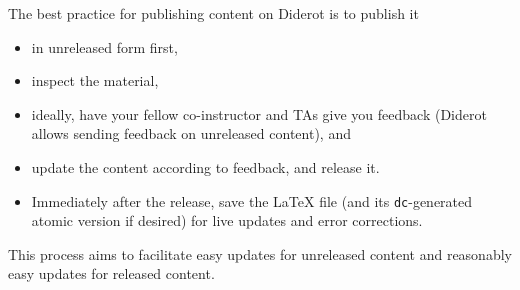 \begin{gram}
The best practice for publishing content on Diderot is to publish it 
\begin{itemize}
\item in unreleased form first, 
\item inspect the material,
\item ideally, have your fellow co-instructor and TAs give you feedback (Diderot allows sending feedback on unreleased content), and 
\item update the content according to feedback, and release it.
\item Immediately after the release, save the LaTeX file (and its \lstinline`dc`-generated atomic version if desired) for live updates and error corrections.
\end{itemize}

This process aims to facilitate easy updates for unreleased content and reasonably easy updates for released content. 
\end{gram}

